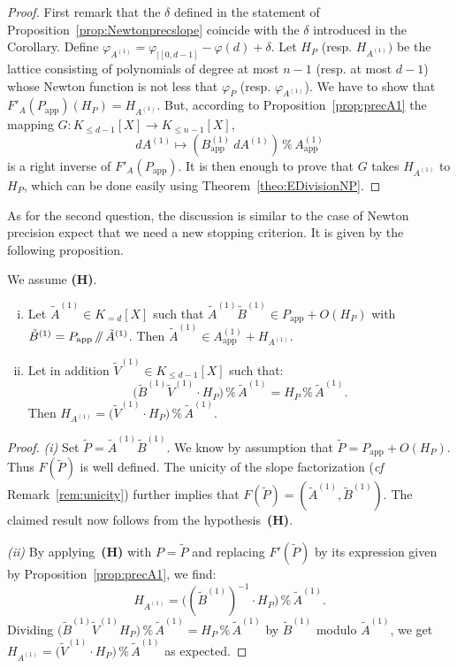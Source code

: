 \documentclass{sig-alternate-2013}
\renewcommand{\mod}{\,\%\,}
\renewcommand{\div}{\,/\hspace{-0.3em}/\,}
\newcommand{\app}{\textrm{app}}
\begin{document}
\begin{proof}
First remark that the $\delta$ defined in the statement of 
Proposition~\ref{prop:Newtonprecslope} coincide with the $\delta$
introduced in the Corollary. Define
$\varphi_{A^{(1)}} = \varphi_{|[0,d{-}1]} - \varphi(d) + \delta$.
Let $H_P$ (resp. $H_{A^{(1)}})$ be the lattice consisting of
polynomials of degree at most $n{-}1$ (resp. at most $d{-}1$)
whose Newton function is not less that $\varphi_P$ (resp. 
$\varphi_{A^{(1)}}$). We have to show that $F'_A(P_\app)(H_P) = 
H_{A^{(1)}}$. But, according to Proposition~\ref{prop:precA1}
the mapping $G : K_{\leq d{-}1}[X] \to K_{\leq n{-}1}[X]$,
$$dA^{(1)} \mapsto (B_\app^{(1)} \: dA^{(1)}) \mod A_\app^{(1)}$$
is a right inverse of $F'_A(P_\app)$. It is then enough to prove
that $G$ takes $H_{A^{(1)}}$ to $H_P$, which can be done easily
using Theorem~\ref{theo:EDivisionNP}.
\end{proof}

As for the second question, the discussion is similar to the case of 
Newton precision expect that we need a new stopping criterion. It is given 
by the following proposition.

\begin{prop}
We assume \textbf{(H)}. 

\vspace{-2mm}

\begin{enumerate}[(i)]
\item Let $\tilde A^{(1)} \in K_{=d}[X]$ such that
$\tilde A^{(1)} \tilde B^{(1)} \in P_\app + O(H_P)$ with
$\tilde B^{(1)} = P_\app \div \tilde A^{(1)}$.
Then $\tilde A^{(1)} \in A_\app^{(1)} + H_{A^{(1)}}$.
\item Let in addition $\tilde V^{(1)} \in K_{\leq d{-}1}[X]$ such that:
$$\big(\tilde B^{(1)} \tilde V^{(1)} \cdot H_P\big) \mod \tilde A^{(1)}
= H_P \mod \tilde A^{(1)}.$$
Then $H_{A^{(1)}} = \big(\tilde V^{(1)} \cdot H_P\big) \mod \tilde A^{(1)}$.
\end{enumerate}
\end{prop}

\begin{proof}
\emph{(i)} 
Set $\tilde P = \tilde A^{(1)} \tilde B^{(1)}$. We know by assumption
that $\tilde P = P_\app + O(H_P)$. Thus $F(\tilde P)$ is well defined.
The unicity of the slope factorization (\emph{cf} 
Remark~\ref{rem:unicity}) further implies that $F(\tilde P) = 
(\tilde A^{(1)}, \tilde B^{(1)})$. The claimed result now follows from
the hypothesis~\textbf{(H)}.

\smallskip

\emph{(ii)} By applying~\textbf{(H)} with $P = \tilde P$ and replacing 
$F'(\tilde P)$ by its expression given by Proposition~\ref{prop:precA1}, 
we find:
$$H_{A^{(1)}} = \big((\tilde B^{(1)})^{-1} \cdot H_P\big) \mod \tilde A^{(1)}.$$
Dividing $\big(\tilde B^{(1)} \tilde V^{(1)} H_P\big) \mod \tilde 
A^{(1)} = H_P \mod \tilde A^{(1)}$ by $\tilde B^{(1)}$ modulo $\tilde
A^{(1)}$, we get
$H_{A^{(1)}} = \big(\tilde V^{(1)} \cdot H_P\big) \mod \tilde A^{(1)}$
as expected.
\end{proof}
\end{document}
